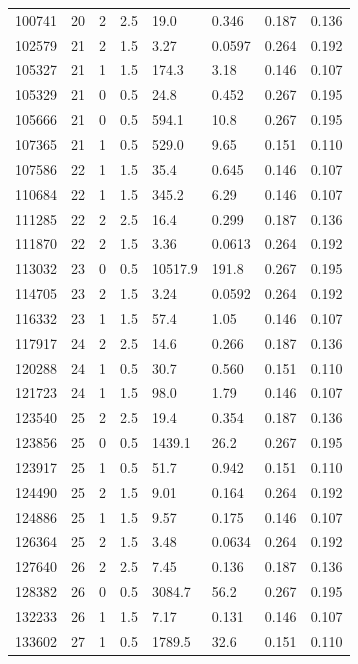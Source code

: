 \documentclass[preview]{standalone}
\begin{document}
{{{\begin{tabular}{L{1.2cm}C{1.2cm} C{0.3cm}C{0.5cm} C{1.4cm}C{1.4cm} C{1.4cm}C{1.4cm}}
  100741  &    20  & 2     & 2.5 &  19.0  & 0.346  & 0.187 &  0.136   \\ 
  102579  &    21  & 2     & 1.5 &  3.27  & 0.0597  & 0.264 &  0.192   \\ 
  105327  &    21  & 1     & 1.5 &  174.3  & 3.18  & 0.146 &  0.107   \\ 
  105329  &    21  & 0     & 0.5 &  24.8  & 0.452  & 0.267 &  0.195   \\ 
  105666  &    21  & 0     & 0.5 &  594.1  & 10.8  & 0.267 &  0.195   \\ 
  107365  &    21  & 1     & 0.5 &  529.0  & 9.65  & 0.151 &  0.110   \\ 
  107586  &    22  & 1     & 1.5 &  35.4  & 0.645  & 0.146 &  0.107   \\ 
  110684  &    22  & 1     & 1.5 &  345.2  & 6.29  & 0.146 &  0.107   \\ 
  111285  &    22  & 2     & 2.5 &  16.4  & 0.299  & 0.187 &  0.136   \\ 
  111870  &    22  & 2     & 1.5 &  3.36  & 0.0613  & 0.264 &  0.192   \\ 
  113032  &    23  & 0     & 0.5 &  10517.9  & 191.8  & 0.267 &  0.195   \\ 
  114705  &    23  & 2     & 1.5 &  3.24  & 0.0592  & 0.264 &  0.192   \\ 
  116332  &    23  & 1     & 1.5 &  57.4  & 1.05  & 0.146 &  0.107   \\ 
  117917  &    24  & 2     & 2.5 &  14.6  & 0.266  & 0.187 &  0.136   \\ 
  120288  &    24  & 1     & 0.5 &  30.7  & 0.560  & 0.151 &  0.110   \\ 
  121723  &    24  & 1     & 1.5 &  98.0  & 1.79  & 0.146 &  0.107   \\ 
  123540  &    25  & 2     & 2.5 &  19.4  & 0.354  & 0.187 &  0.136   \\ 
  123856  &    25  & 0     & 0.5 &  1439.1  & 26.2  & 0.267 &  0.195   \\ 
  123917  &    25  & 1     & 0.5 &  51.7  & 0.942  & 0.151 &  0.110   \\ 
  124490  &    25  & 2     & 1.5 &  9.01  & 0.164  & 0.264 &  0.192   \\ 
  124886  &    25  & 1     & 1.5 &  9.57  & 0.175  & 0.146 &  0.107   \\ 
  126364  &    25  & 2     & 1.5 &  3.48  & 0.0634  & 0.264 &  0.192   \\ 
  127640  &    26  & 2     & 2.5 &  7.45  & 0.136  & 0.187 &  0.136   \\ 
  128382  &    26  & 0     & 0.5 &  3084.7  & 56.2  & 0.267 &  0.195   \\ 
  132233  &    26  & 1     & 1.5 &  7.17  & 0.131  & 0.146 &  0.107   \\ 
  133602  &    27  & 1     & 0.5 &  1789.5  & 32.6  & 0.151 &  0.110   \\ 
\hline 
\end{tabular} 

}}}
\end{document}
